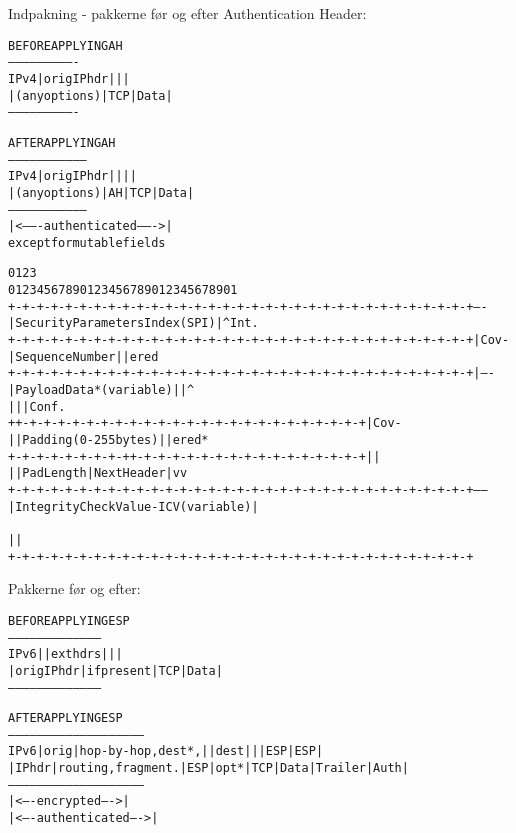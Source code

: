\documentclass[Screen16to9,17pt]{foils}
\begin{document}

Indpakning - pakkerne før og efter Authentication Header:
\begin{alltt}
\small
                BEFORE APPLYING AH
            ----------------------------
      IPv4  |orig IP hdr  |     |      |
            |(any options)| TCP | Data |
            ----------------------------

                  AFTER APPLYING AH
            ---------------------------------
      IPv4  |orig IP hdr  |    |     |      |
            |(any options)| AH | TCP | Data |
            ---------------------------------
            |<------- authenticated ------->|
                 except for mutable fields
\end{alltt}


\begin{alltt}\small
0                   1                   2                   3
0 1 2 3 4 5 6 7 8 9 0 1 2 3 4 5 6 7 8 9 0 1 2 3 4 5 6 7 8 9 0 1
+-+-+-+-+-+-+-+-+-+-+-+-+-+-+-+-+-+-+-+-+-+-+-+-+-+-+-+-+-+-+-+-+ ----
|               Security Parameters Index (SPI)                 | ^Int.
+-+-+-+-+-+-+-+-+-+-+-+-+-+-+-+-+-+-+-+-+-+-+-+-+-+-+-+-+-+-+-+-+ |Cov-
|                      Sequence Number                          | |ered
+-+-+-+-+-+-+-+-+-+-+-+-+-+-+-+-+-+-+-+-+-+-+-+-+-+-+-+-+-+-+-+-+ | ----
|                    Payload Data* (variable)                   | |   ^
|                                                               | |Conf.
+               +-+-+-+-+-+-+-+-+-+-+-+-+-+-+-+-+-+-+-+-+-+-+-+-+ |Cov-
|               |     Padding (0-255 bytes)                     | |ered*
+-+-+-+-+-+-+-+-+               +-+-+-+-+-+-+-+-+-+-+-+-+-+-+-+-+ |   |
|                               |  Pad Length   | Next Header   | v   v
+-+-+-+-+-+-+-+-+-+-+-+-+-+-+-+-+-+-+-+-+-+-+-+-+-+-+-+-+-+-+-+-+ ------
|         Integrity Check Value-ICV   (variable)                |
~                                                               ~
|                                                               |
+-+-+-+-+-+-+-+-+-+-+-+-+-+-+-+-+-+-+-+-+-+-+-+-+-+-+-+-+-+-+-+-+
\end{alltt}

Pakkerne før og efter:
\begin{alltt}\small
               BEFORE APPLYING ESP
         ---------------------------------------
   IPv6  |             | ext hdrs |     |      |
         | orig IP hdr |if present| TCP | Data |
         ---------------------------------------



               AFTER APPLYING ESP
         ---------------------------------------------------------
   IPv6  | orig |hop-by-hop,dest*,|   |dest|   |    | ESP   | ESP|
         |IP hdr|routing,fragment.|ESP|opt*|TCP|Data|Trailer|Auth|
         ---------------------------------------------------------
                                   |<---- encrypted ---->|
                               |<---- authenticated ---->|
\end{alltt}
\end{document}
